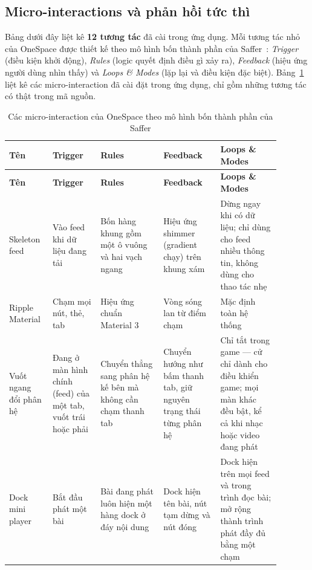 \subsection{Micro-interactions và phản hồi tức thì}
\label{sec:micro-interactions}

Bảng dưới đây liệt kê \textbf{12 tương tác} đã cài trong ứng dụng. Mỗi tương tác nhỏ của OneSpace được thiết kế theo mô hình bốn thành phần của Saffer~\cite{saffer2013}: \textit{Trigger} (điều kiện khởi động), \textit{Rules} (logic quyết định điều gì xảy ra), \textit{Feedback} (hiệu ứng người dùng nhìn thấy) và \textit{Loops \& Modes} (lặp lại và điều kiện đặc biệt). Bảng~\ref{tab:micro-interactions} liệt kê các micro-interaction đã cài đặt trong ứng dụng, chỉ gồm những tương tác có thật trong mã nguồn.

\begin{longtable}{>{\RaggedRight\arraybackslash}p{0.13\linewidth} >{\RaggedRight\arraybackslash}p{0.16\linewidth} >{\RaggedRight\arraybackslash}p{0.21\linewidth} >{\RaggedRight\arraybackslash}p{0.19\linewidth} >{\RaggedRight\arraybackslash}p{0.20\linewidth}}
\caption{Các micro-interaction của OneSpace theo mô hình bốn thành phần của Saffer}
\label{tab:micro-interactions}\\
\toprule
\textbf{Tên} & \textbf{Trigger} & \textbf{Rules} & \textbf{Feedback} & \textbf{Loops \& Modes} \\
\midrule
\endfirsthead
\toprule
\textbf{Tên} & \textbf{Trigger} & \textbf{Rules} & \textbf{Feedback} & \textbf{Loops \& Modes} \\
\midrule
\endhead
\bottomrule
\endfoot
Skeleton feed & Vào feed khi dữ liệu đang tải & Bốn hàng khung gồm một ô vuông và hai vạch ngang & Hiệu ứng shimmer (gradient chạy) trên khung xám & Dừng ngay khi có dữ liệu; chỉ dùng cho feed nhiều thông tin, không dùng cho thao tác nhẹ \\
\midrule
Ripple Material & Chạm mọi nút, thẻ, tab & Hiệu ứng chuẩn Material 3 & Vòng sóng lan từ điểm chạm & Mặc định toàn hệ thống \\
\midrule
Vuốt ngang đổi phân hệ & Đang ở màn hình chính (feed) của một tab, vuốt trái hoặc phải & Chuyển thẳng sang phân hệ kế bên mà không cần chạm thanh tab & Chuyển hướng như bấm thanh tab, giữ nguyên trạng thái từng phân hệ & Chỉ tắt trong game --- cử chỉ dành cho điều khiển game; mọi màn khác đều bật, kể cả khi nhạc hoặc video đang phát \\
\midrule
Dock mini player & Bắt đầu phát một bài & Bài đang phát luôn hiện một hàng dock ở đáy nội dung & Dock hiện tên bài, nút tạm dừng và nút đóng & Dock hiện trên mọi feed và trong trình đọc bài; mở rộng thành trình phát đầy đủ bằng một chạm \\

\end{longtable}
